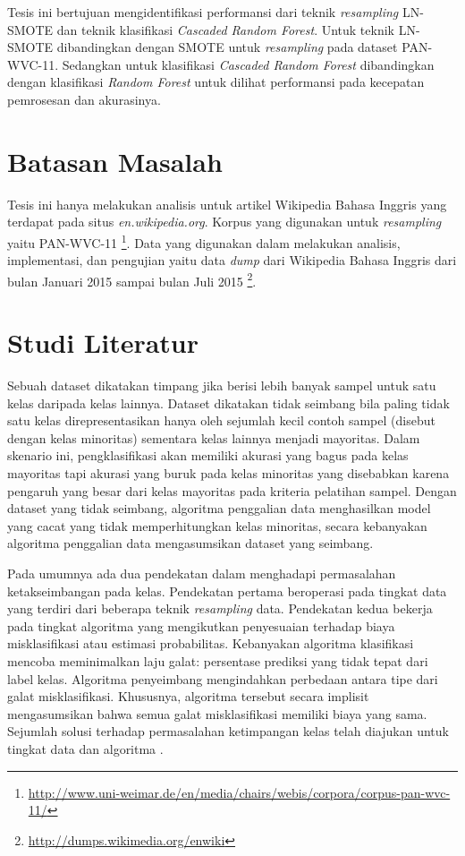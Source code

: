 \documentclass[12pt,a4paper,titlepage]{article}
\begin{document}
Tesis ini bertujuan mengidentifikasi performansi dari teknik \textit{resampling} LN-SMOTE dan teknik klasifikasi \textit{Cascaded Random Forest}.
Untuk teknik LN-SMOTE dibandingkan dengan SMOTE untuk \textit{resampling} pada dataset PAN-WVC-11.
Sedangkan untuk klasifikasi \textit{Cascaded Random Forest} dibandingkan dengan klasifikasi \textit{Random Forest} untuk dilihat performansi pada kecepatan pemrosesan dan akurasinya.

\section{Batasan Masalah}\label{sec:batasan-masalah}

Tesis ini hanya melakukan analisis untuk artikel Wikipedia Bahasa Inggris yang terdapat pada situs \textit{en.wikipedia.org}.
Korpus yang digunakan untuk \textit{resampling} yaitu PAN-WVC-11 \footnote{\RaggedRight\url{http://www.uni-weimar.de/en/media/chairs/webis/corpora/corpus-pan-wvc-11/}}.
Data yang digunakan dalam melakukan analisis, implementasi, dan pengujian yaitu data \textit{dump} dari Wikipedia Bahasa Inggris dari bulan Januari 2015 sampai bulan Juli 2015
\footnote{\url{http://dumps.wikimedia.org/enwiki}}.

\section{Studi Literatur}\label{sec:studi-literatur}

Sebuah dataset dikatakan timpang jika berisi lebih banyak sampel untuk satu kelas daripada kelas lainnya.
Dataset dikatakan tidak seimbang bila paling tidak satu kelas direpresentasikan hanya oleh sejumlah kecil contoh sampel (disebut dengan kelas minoritas) sementara kelas lainnya menjadi mayoritas.
Dalam skenario ini, pengklasifikasi akan memiliki akurasi yang bagus pada kelas mayoritas tapi akurasi yang buruk pada kelas minoritas yang disebabkan karena pengaruh yang besar dari kelas mayoritas pada kriteria pelatihan sampel.
Dengan dataset yang tidak seimbang, algoritma penggalian data menghasilkan model yang cacat yang tidak memperhitungkan kelas minoritas, secara kebanyakan algoritma penggalian data mengasumsikan dataset yang seimbang.

Pada umumnya ada dua pendekatan dalam menghadapi permasalahan ketakseimbangan pada kelas.
Pendekatan pertama beroperasi pada tingkat data yang terdiri dari beberapa teknik \textit{resampling} data.
Pendekatan kedua bekerja pada tingkat algoritma yang mengikutkan penyesuaian terhadap biaya misklasifikasi atau estimasi probabilitas.
Kebanyakan algoritma klasifikasi mencoba meminimalkan laju galat: persentase prediksi yang tidak tepat dari label kelas.
Algoritma penyeimbang mengindahkan perbedaan antara tipe dari galat misklasifikasi.
Khususnya, algoritma tersebut secara implisit mengasumsikan bahwa semua galat misklasifikasi memiliki biaya yang sama.
Sejumlah solusi terhadap permasalahan ketimpangan kelas telah diajukan untuk tingkat data dan algoritma \cite{chawla2004editorial}.
\end{document}

